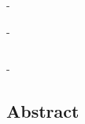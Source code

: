\documentclass[a4paper,10pt,fleqn,openright]{Quark}
\begin{document}
\begin{adjustwidth}{0pt}{-\marginBiblio}

\newpage


\end{adjustwidth}

\begin{adjustwidth}{0pt}{-\marginBiblio}



\end{adjustwidth}


\newpage
$~$
\newpage

\begin{adjustwidth}{0pt}{-\marginBiblio}
\thispagestyle{empty}

\begin{small}

\section*{Abstract}


\end{small}

\label{p:finalPage}

\end{adjustwidth}
\end{document}
